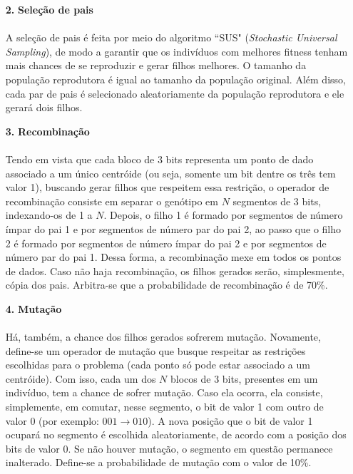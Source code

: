 \documentclass{report}
\begin{document}
\begin{itemize}
	\item[\textbf{2.}] \textbf{Seleção de pais}
	
	\paragraph{} A seleção de pais é feita por meio do algoritmo ``SUS" (\textit{Stochastic Universal Sampling}), de modo a garantir que os indivíduos com melhores fitness tenham mais chances de se reproduzir e gerar filhos melhores. O tamanho da população reprodutora é igual ao tamanho da população original. Além disso, cada par de pais é selecionado aleatoriamente da população reprodutora e ele gerará dois filhos.\\
	
	\item[\textbf{3.}] \textbf{Recombinação}
	
	\paragraph{} Tendo em vista que cada bloco de 3 bits representa um ponto de dado associado a um único centróide (ou seja, somente um bit dentre os três tem valor 1), buscando gerar filhos que respeitem essa restrição, o operador de recombinação consiste em separar o genótipo em $N$ segmentos de 3 bits, indexando-os de 1 a $N$. Depois, o filho 1 é formado por segmentos de número ímpar do pai 1 e por segmentos de número par do pai 2, ao passo que o filho 2 é formado por segmentos de número ímpar do pai 2 e por segmentos de número par do pai 1. Dessa forma, a recombinação mexe em todos os pontos de dados. Caso não haja recombinação, os filhos gerados serão, simplesmente, cópia dos pais. Arbitra-se que a probabilidade de recombinação é de 70\%.
	
	\item[\textbf{4.}] \textbf{Mutação}
	
	\paragraph{} Há, também, a chance dos filhos gerados sofrerem mutação. Novamente, define-se um operador de mutação que busque respeitar as restrições escolhidas para o problema (cada ponto só pode estar associado a um centróide). Com isso, cada um dos $N$ blocos de 3 bits, presentes em um indivíduo, tem a chance de sofrer mutação. Caso ela ocorra, ela consiste, simplemente, em comutar, nesse segmento, o bit de valor 1 com outro de valor 0 (por exemplo: $001 \rightarrow 010$). A nova posição que o bit de valor 1 ocupará no segmento é escolhida aleatoriamente, de acordo com a posição dos bits de valor 0. Se não houver mutação, o segmento em questão permanece inalterado. Define-se a probabilidade de mutação com o valor de 10\%.\\
	

\end{itemize}
\end{document}
